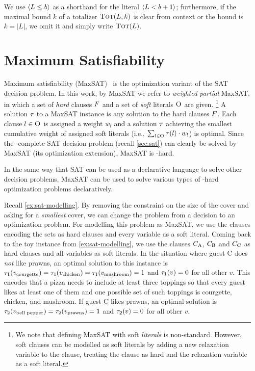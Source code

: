 We use $\langle L \leq b \rangle$ as a shorthand for the literal $\langle L < b+1 \rangle$;
furthermore, if the maximal bound $k$ of a totalizer $\textsc{Tot}(L,k)$ is clear from context or the bound is $k=|L|$, we omit it and simply write $\textsc{Tot}(L)$.

\section{Maximum Satisfiability\label{sec:max-sat}}

Maximum satisfiability (MaxSAT)~\autocite{handbook2-maxsat} is the optimization variant of the SAT decision problem.
In this work, by MaxSAT we refer to \emph{weighted partial} MaxSAT, in which a set of \emph{hard} clauses $F$ and a set of \emph{soft} literals $\textsc{O}$ are given.%
\footnote{We note that defining MaxSAT with soft \emph{literals} is non-standard. However, soft clauses can be modelled as soft literals by adding a new relaxation variable to the clause, treating the clause as hard and the relaxation variable as a soft literal.}
A solution $\tau$ to a MaxSAT instance is any solution to the hard clauses $F$.
Each clause $l \in \textsc{O}$ is assigned a weight $w_l$ and a solution $\tau$ achieving the smallest cumulative weight of assigned soft literals (i.e., $\sum_{l \in \textsc{O}} \tau(l) \cdot w_l$) is optimal.
Since the \NP-complete SAT decision problem (recall \cref{sec:sat}) can clearly be solved by MaxSAT (its optimization extension), MaxSAT is \NP-hard.

In the same way that SAT can be used as a declarative language to solve other decision problems, MaxSAT can be used to solve various types of \NP-hard optimization problems declaratively.

\begin{example}\label{ex:maxsat-modelling}
  Recall \cref{ex:sat-modelling}.
  By removing the constraint on the size of the cover and asking for a \emph{smallest} cover, we can change the problem from a decision to an optimization problem.
  For modelling this problem as MaxSAT, we use the clauses encoding the sets as hard clauses and every variable as a soft literal.
  Coming back to the toy instance from \cref{ex:sat-modelling}, we use the clauses $C_\text{A}$, $C_\text{B}$ and $C_\text{C}$ as hard clauses and all variables as soft literals.
  In the situation where guest C does \emph{not} like prawns, an optimal solution to this instance is $\tau_1(v_\text{courgette}) = \tau_1(v_\text{chicken}) = \tau_1(v_\text{mushroom}) = 1$ and $\tau_1(v) = 0$ for all other $v$.
  This encodes that a pizza needs to include at least three toppings so that every guest likes at least one of them and one possible set of such toppings is courgette, chicken, and mushroom.
  If guest C likes prawns, an optimal solution is $\tau_2(v_\text{bell pepper}) = \tau_2(v_\text{prawns}) = 1$ and $\tau_2(v) = 0$ for all other $v$.
\end{example}

